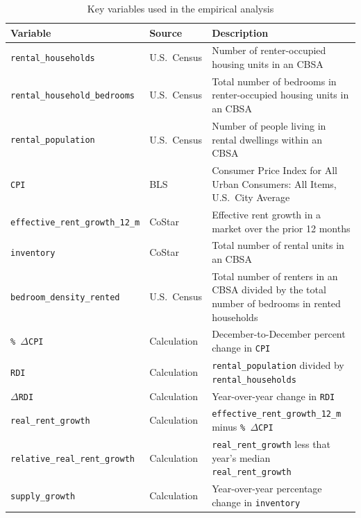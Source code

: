 \documentclass[pdflatex,sn-basic]{sn-jnl}%
\theoremstyle{thmstyleone}%
\theoremstyle{thmstyletwo}%
\theoremstyle{thmstylethree}%
\begin{document}
\setlength{\tabcolsep}{4pt} %
\begin{table}[htbp]	\centering
	\caption{Key variables used in the empirical analysis}
	\label{tab:variables}
	\begin{tabularx}{\textwidth}{@{}l l X@{}}
		\toprule
		\textbf{Variable} & \textbf{Source} & \textbf{Description} \\
		\midrule
		\texttt{rental\_households} & U.S.\ Census & Number of renter-occupied housing units in an CBSA \\
		\texttt{rental\_household\_bedrooms} & U.S.\ Census & Total number of bedrooms in renter-occupied housing units in an CBSA \\
		\texttt{rental\_population} & U.S.\ Census & Number of people living in rental dwellings within an CBSA \\
		\texttt{CPI} & BLS & Consumer Price Index for All Urban Consumers: All Items, U.S.\ City Average \\
		\texttt{effective\_rent\_growth\_12\_m} & CoStar & Effective rent growth in a market over the prior 12 months \\
		\texttt{inventory} & CoStar & Total number of rental units in an CBSA \\
		\texttt{bedroom\_density\_rented} & U.S.\ Census & Total number of renters in an CBSA divided by the total number of bedrooms in rented households \\
		\texttt{\%\,$\Delta$CPI} & Calculation & December-to-December percent change in \texttt{CPI} \\
		\texttt{RDI} & Calculation & \texttt{rental\_population} divided by \texttt{rental\_households} \\
		\texttt{$\Delta$RDI} & Calculation & Year-over-year change in \texttt{RDI} \\
		\texttt{real\_rent\_growth} & Calculation & \texttt{effective\_rent\_growth\_12\_m} minus \texttt{\%\,$\Delta$CPI} \\
		\texttt{relative\_real\_rent\_growth} & Calculation & \texttt{real\_rent\_growth} less that year’s median \texttt{real\_rent\_growth} \\
		\texttt{supply\_growth} & Calculation & Year-over-year percentage change in \texttt{inventory} \\
		\bottomrule
	\end{tabularx}
\end{table}
\end{document}
